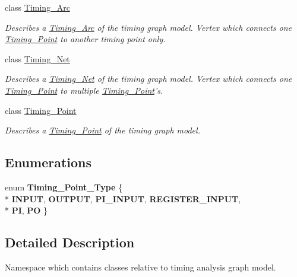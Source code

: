 \begin{DoxyCompactItemize}
class \hyperlink{classTiming__Analysis_1_1Timing__Arc}{Timing\-\_\-\-Arc}
\begin{DoxyCompactList}\small\item\em Describes a \hyperlink{classTiming__Analysis_1_1Timing__Arc}{Timing\-\_\-\-Arc} of the timing graph model. Vertex which connects one \hyperlink{classTiming__Analysis_1_1Timing__Point}{Timing\-\_\-\-Point} to another timing point only. \end{DoxyCompactList}\item 
class \hyperlink{classTiming__Analysis_1_1Timing__Net}{Timing\-\_\-\-Net}
\begin{DoxyCompactList}\small\item\em Describes a \hyperlink{classTiming__Analysis_1_1Timing__Net}{Timing\-\_\-\-Net} of the timing graph model. Vertex which connects one \hyperlink{classTiming__Analysis_1_1Timing__Point}{Timing\-\_\-\-Point} to multiple \hyperlink{classTiming__Analysis_1_1Timing__Point}{Timing\-\_\-\-Point}'s. \end{DoxyCompactList}\item 
class \hyperlink{classTiming__Analysis_1_1Timing__Point}{Timing\-\_\-\-Point}
\begin{DoxyCompactList}\small\item\em Describes a \hyperlink{classTiming__Analysis_1_1Timing__Point}{Timing\-\_\-\-Point} of the timing graph model. \end{DoxyCompactList}\end{DoxyCompactItemize}
\subsection*{Enumerations}
\begin{DoxyCompactItemize}
\item 
enum {\bfseries Timing\-\_\-\-Point\-\_\-\-Type} \{ \\*
{\bfseries I\-N\-P\-U\-T}, 
{\bfseries O\-U\-T\-P\-U\-T}, 
{\bfseries P\-I\-\_\-\-I\-N\-P\-U\-T}, 
{\bfseries R\-E\-G\-I\-S\-T\-E\-R\-\_\-\-I\-N\-P\-U\-T}, 
\\*
{\bfseries P\-I}, 
{\bfseries P\-O}
 \}
\end{DoxyCompactItemize}


\subsection{Detailed Description}
Namespace which contains classes relative to timing analysis graph model. 